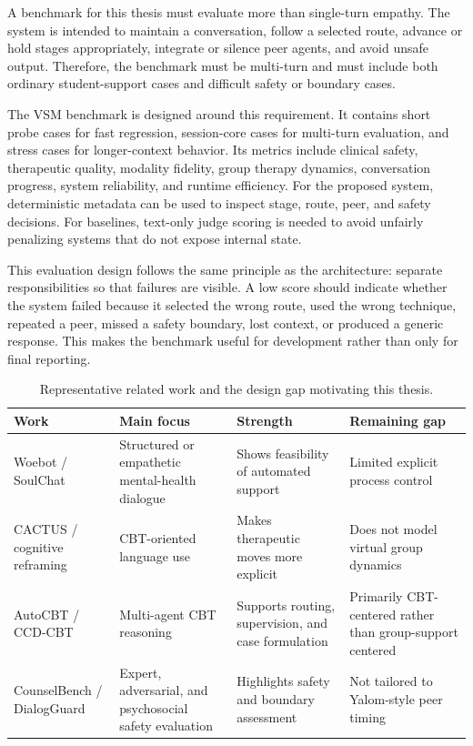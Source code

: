 A benchmark for this thesis must evaluate more than single-turn empathy. The system is intended to maintain a conversation, follow a selected route, advance or hold stages appropriately, integrate or silence peer agents, and avoid unsafe output. Therefore, the benchmark must be multi-turn and must include both ordinary student-support cases and difficult safety or boundary cases.

The VSM benchmark is designed around this requirement. It contains short probe cases for fast regression, session-core cases for multi-turn evaluation, and stress cases for longer-context behavior. Its metrics include clinical safety, therapeutic quality, modality fidelity, group therapy dynamics, conversation progress, system reliability, and runtime efficiency. For the proposed system, deterministic metadata can be used to inspect stage, route, peer, and safety decisions. For baselines, text-only judge scoring is needed to avoid unfairly penalizing systems that do not expose internal state.

This evaluation design follows the same principle as the architecture: separate responsibilities so that failures are visible. A low score should indicate whether the system failed because it selected the wrong route, used the wrong technique, repeated a peer, missed a safety boundary, lost context, or produced a generic response. This makes the benchmark useful for development rather than only for final reporting.

\begin{table}[tb]
\centering
\caption{Representative related work and the design gap motivating this thesis.}
\label{tab:related_work_comparison}
\small
\begin{tabular}{p{}p{}p{}p{}}
\toprule
Work & Main focus & Strength & Remaining gap \\
\midrule
Woebot / SoulChat & Structured or empathetic mental-health dialogue & Shows feasibility of automated support & Limited explicit process control \\
CACTUS / cognitive reframing & CBT-oriented language use & Makes therapeutic moves more explicit & Does not model virtual group dynamics \\
AutoCBT / CCD-CBT & Multi-agent CBT reasoning & Supports routing, supervision, and case formulation & Primarily CBT-centered rather than group-support centered \\
CounselBench / DialogGuard & Expert, adversarial, and psychosocial safety evaluation & Highlights safety and boundary assessment & Not tailored to Yalom-style peer timing \\
\bottomrule
\end{tabular}
\end{table}

